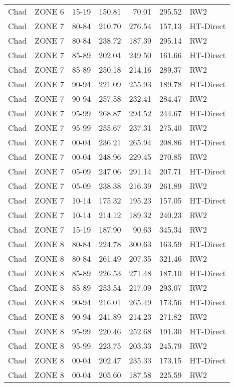 \begin{longtable}{lllrrrl}
  Chad & ZONE 6 & 15-19 & 150.81 & 70.01 & 295.52 & RW2 \\ 
  Chad & ZONE 7 & 80-84 & 210.70 & 276.54 & 157.13 & HT-Direct \\ 
  Chad & ZONE 7 & 80-84 & 238.72 & 187.39 & 295.14 & RW2 \\ 
  Chad & ZONE 7 & 85-89 & 202.04 & 249.50 & 161.66 & HT-Direct \\ 
  Chad & ZONE 7 & 85-89 & 250.18 & 214.16 & 289.37 & RW2 \\ 
  Chad & ZONE 7 & 90-94 & 221.09 & 255.93 & 189.78 & HT-Direct \\ 
  Chad & ZONE 7 & 90-94 & 257.58 & 232.41 & 284.47 & RW2 \\ 
  Chad & ZONE 7 & 95-99 & 268.87 & 294.52 & 244.67 & HT-Direct \\ 
  Chad & ZONE 7 & 95-99 & 255.67 & 237.31 & 275.40 & RW2 \\ 
  Chad & ZONE 7 & 00-04 & 236.21 & 265.94 & 208.86 & HT-Direct \\ 
  Chad & ZONE 7 & 00-04 & 248.96 & 229.45 & 270.85 & RW2 \\ 
  Chad & ZONE 7 & 05-09 & 247.06 & 291.14 & 207.71 & HT-Direct \\ 
  Chad & ZONE 7 & 05-09 & 238.38 & 216.39 & 261.89 & RW2 \\ 
  Chad & ZONE 7 & 10-14 & 175.32 & 195.23 & 157.05 & HT-Direct \\ 
  Chad & ZONE 7 & 10-14 & 214.12 & 189.32 & 240.23 & RW2 \\ 
  Chad & ZONE 7 & 15-19 & 187.90 & 90.63 & 345.34 & RW2 \\ 
  Chad & ZONE 8 & 80-84 & 224.78 & 300.63 & 163.59 & HT-Direct \\ 
  Chad & ZONE 8 & 80-84 & 261.49 & 207.35 & 321.46 & RW2 \\ 
  Chad & ZONE 8 & 85-89 & 226.53 & 271.48 & 187.10 & HT-Direct \\ 
  Chad & ZONE 8 & 85-89 & 253.54 & 217.09 & 293.07 & RW2 \\ 
  Chad & ZONE 8 & 90-94 & 216.01 & 265.49 & 173.56 & HT-Direct \\ 
  Chad & ZONE 8 & 90-94 & 241.89 & 214.23 & 271.82 & RW2 \\ 
  Chad & ZONE 8 & 95-99 & 220.46 & 252.68 & 191.30 & HT-Direct \\ 
  Chad & ZONE 8 & 95-99 & 223.75 & 203.33 & 245.79 & RW2 \\ 
  Chad & ZONE 8 & 00-04 & 202.47 & 235.33 & 173.15 & HT-Direct \\ 
  Chad & ZONE 8 & 00-04 & 205.60 & 187.58 & 225.59 & RW2 \\ 

\end{longtable}
